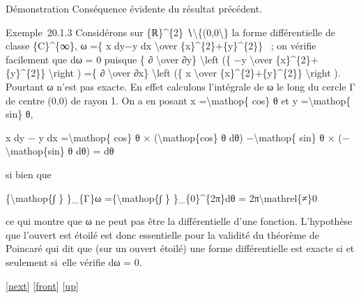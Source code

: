 \documentclass[]{article}
\begin{document}
Démonstration Conséquence évidente du résultat précédent.

Exemple~20.1.3 Considérons sur \{ℝ\}\^{}\{2\}
∖\textbackslash{}\{(0,0\textbackslash{}\} la forme différentielle de
classe \{C\}\^{}\{∞\}, ω =\{ x dy−y dx \textbackslash{}over
\{x\}\^{}\{2\}+\{y\}\^{}\{2\}\} ~; on vérifie facilement que dω = 0
puisque \{ ∂ \textbackslash{}over ∂y\} \textbackslash{}left (\{ −y
\textbackslash{}over \{x\}\^{}\{2\}+\{y\}\^{}\{2\}\}
\textbackslash{}right ) =\{ ∂ \textbackslash{}over ∂x\}
\textbackslash{}left (\{ x \textbackslash{}over
\{x\}\^{}\{2\}+\{y\}\^{}\{2\}\} \textbackslash{}right ). Pourtant ω
n'est pas exacte. En effet calculons l'intégrale de ω le long du cercle
Γ de centre (0,0) de rayon 1. On a en posant x =\textbackslash{}mathop\{
cos\} θ et y =\textbackslash{}mathop\{ sin\} θ,

x dy − y dx =\textbackslash{}mathop\{ cos\} θ ×
(\textbackslash{}mathop\{cos\} θ dθ) −\textbackslash{}mathop\{ sin\} θ ×
(−\textbackslash{}mathop\{sin\} θ dθ) = dθ

si bien que

\{\textbackslash{}mathop\{∫ \} \}\_\{Γ\}ω =\{\textbackslash{}mathop\{∫
\} \}\_\{0\}\^{}\{2π\}dθ = 2π\textbackslash{}mathrel\{≠\}0

ce qui montre que ω ne peut pas être la différentielle d'une fonction.
L'hypothèse que l'ouvert est étoilé est donc essentielle pour la
validité du théorème de Poincaré qui dit que (sur un ouvert étoilé) une
forme différentielle est exacte si et seulement si~elle vérifie dω = 0.

{[}\href{coursse105.html}{next}{]} {[}\href{coursse104.html}{front}{]}
{[}\href{coursch21.html\#coursse104.html}{up}{]}
\end{document}
